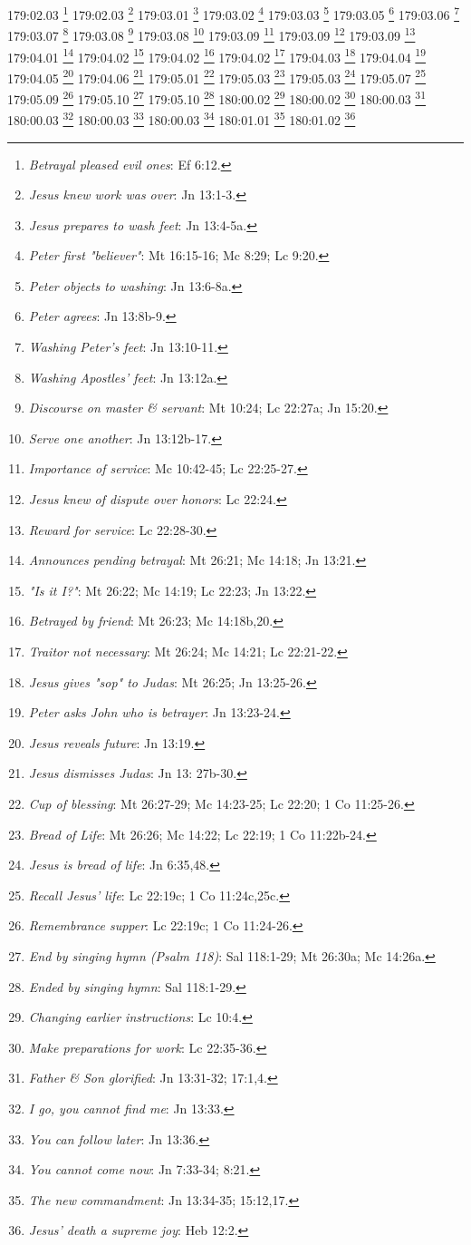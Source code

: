 179:02.03 \footnote{\textit{Betrayal pleased evil ones}: Ef 6:12.}
179:02.03 \footnote{\textit{Jesus knew work was over}: Jn 13:1-3.}
179:03.01 \footnote{\textit{Jesus prepares to wash feet}: Jn 13:4-5a.}
179:03.02 \footnote{\textit{Peter first "believer"}: Mt 16:15-16; Mc 8:29; Lc 9:20.}
179:03.03 \footnote{\textit{Peter objects to washing}: Jn 13:6-8a.}
179:03.05 \footnote{\textit{Peter agrees}: Jn 13:8b-9.}
179:03.06 \footnote{\textit{Washing Peter's feet}: Jn 13:10-11.}
179:03.07 \footnote{\textit{Washing Apostles' feet}: Jn 13:12a.}
179:03.08 \footnote{\textit{Discourse on master & servant}: Mt 10:24; Lc 22:27a; Jn 15:20.}
179:03.08 \footnote{\textit{Serve one another}: Jn 13:12b-17.}
179:03.09 \footnote{\textit{Importance of service}: Mc 10:42-45; Lc 22:25-27.}
179:03.09 \footnote{\textit{Jesus knew of dispute over honors}: Lc 22:24.}
179:03.09 \footnote{\textit{Reward for service}: Lc 22:28-30.}
179:04.01 \footnote{\textit{Announces pending betrayal}: Mt 26:21; Mc 14:18; Jn 13:21.}
179:04.02 \footnote{\textit{"Is it I?"}: Mt 26:22; Mc 14:19; Lc 22:23; Jn 13:22.}
179:04.02 \footnote{\textit{Betrayed by friend}: Mt 26:23; Mc 14:18b,20.}
179:04.02 \footnote{\textit{Traitor not necessary}: Mt 26:24; Mc 14:21; Lc 22:21-22.}
179:04.03 \footnote{\textit{Jesus gives "sop" to Judas}: Mt 26:25; Jn 13:25-26.}
179:04.04 \footnote{\textit{Peter asks John who is betrayer}: Jn 13:23-24.}
179:04.05 \footnote{\textit{Jesus reveals future}: Jn 13:19.}
179:04.06 \footnote{\textit{Jesus dismisses Judas}: Jn 13: 27b-30.}
179:05.01 \footnote{\textit{Cup of blessing}: Mt 26:27-29; Mc 14:23-25; Lc 22:20; 1 Co 11:25-26.}
179:05.03 \footnote{\textit{Bread of Life}: Mt 26:26; Mc 14:22; Lc 22:19; 1 Co 11:22b-24.}
179:05.03 \footnote{\textit{Jesus is bread of life}: Jn 6:35,48.}
179:05.07 \footnote{\textit{Recall Jesus' life}: Lc 22:19c; 1 Co 11:24c,25c.}
179:05.09 \footnote{\textit{Remembrance supper}: Lc 22:19c; 1 Co 11:24-26.}
179:05.10 \footnote{\textit{End by singing hymn (Psalm 118)}: Sal 118:1-29; Mt 26:30a; Mc 14:26a.}
179:05.10 \footnote{\textit{Ended by singing hymn}: Sal 118:1-29.}
180:00.02 \footnote{\textit{Changing earlier instructions}: Lc 10:4.}
180:00.02 \footnote{\textit{Make preparations for work}: Lc 22:35-36.}
180:00.03 \footnote{\textit{Father & Son glorified}: Jn 13:31-32; 17:1,4.}
180:00.03 \footnote{\textit{I go, you cannot find me}: Jn 13:33.}
180:00.03 \footnote{\textit{You can follow later}: Jn 13:36.}
180:00.03 \footnote{\textit{You cannot come now}: Jn 7:33-34; 8:21.}
180:01.01 \footnote{\textit{The new commandment}: Jn 13:34-35; 15:12,17.}
180:01.02 \footnote{\textit{Jesus' death a supreme joy}: Heb 12:2.}
